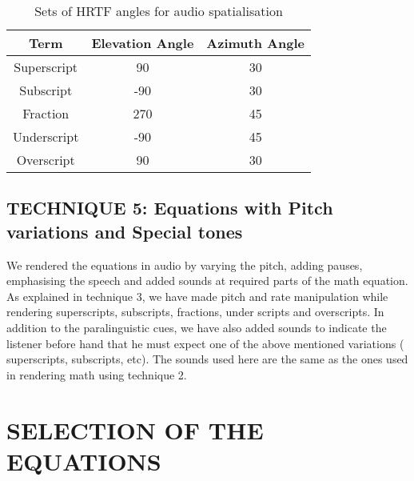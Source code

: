 \documentclass{article}
\begin{document}
\begin{table}[t]
\caption{Sets of HRTF angles for audio spatialisation}

\vspace{8pt} %

\centering
\begin{tabular}{| c | c | c |}
\hline%
Term & Elevation Angle & Azimuth Angle \\[0.5ex]
\hline
Superscript & 90 & 30  \\
Subscript & -90 & 30  \\
Fraction & 270 & 45  \\
Underscript & -90 & 45  \\
Overscript & 90 & 30\\ %
\hline


\end{tabular}
\label{table:hrtf}
\end{table}





\subsection{TECHNIQUE 5: Equations with Pitch variations and Special tones}
\label{ssec:t5}


We rendered the equations in audio by varying the pitch, adding pauses, emphasising the speech and added sounds at required parts of the math equation. As explained in technique 3, we have made pitch and rate manipulation while rendering superscripts, subscripts, fractions, under scripts and overscripts. In addition to the paralinguistic cues, we have also added sounds to indicate the listener before hand that he must expect one of the above mentioned variations ( superscripts, subscripts, etc). The sounds used here are the same as the ones used in rendering math using technique 2.




\section{SELECTION OF THE EQUATIONS}
\label{sec:equations}
\end{document}
